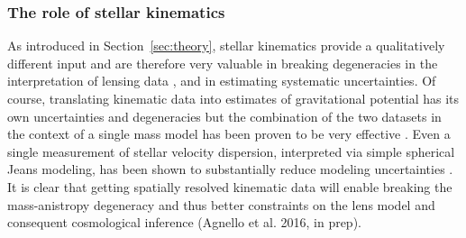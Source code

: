 
\subsubsection{The role of stellar kinematics}

As introduced in Section~\ref{sec:theory}, stellar kinematics provide
a qualitatively different input and are therefore very valuable in
breaking degeneracies in the interpretation of lensing data
\citep[e.g., the mass-sheet degeneracy][]{Koo++03}, and in estimating systematic
uncertainties. Of course, translating kinematic data into estimates of
gravitational potential has its own uncertainties and degeneracies
\citep[e.g. the mass anisotropy degeneracy for pressure supported systems, or projection effects][]{Gav05,New++11,Son++12,Cou++14}
but the combination of the two datasets in the context of a single
mass model has been proven to be very effective
\citep{T+K02a,T+K04}. Even a single measurement of stellar velocity dispersion,
interpreted via simple spherical Jeans modeling, has been shown to
substantially reduce modeling uncertainties
\citep{T+K02b,Koo++03,Suy++14}. It is clear that getting spatially
resolved kinematic data will enable breaking the mass-anistropy
degeneracy \citep[see, e.g.,][and references therein]{Cou++14} and
thus better constraints on the lens model and consequent
cosmological inference (Agnello et al. 2016, in prep).
